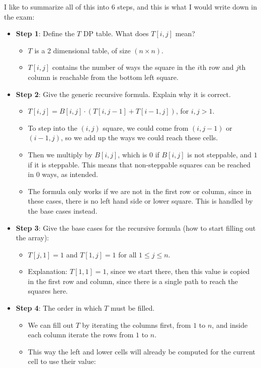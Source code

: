 I like to summarize all of this into 6 steps, and this is what I would write down in the exam:

\begin{itemize}
    \item \textbf{Step 1}: Define the $T$ DP table. What does $T[i,j]$ mean?
    \begin{itemize}
        \item $T$ is a 2 dimensional table, of size $(n \times n)$.
        \item $T[i, j]$ contains the number of ways the square in the $i$th row and $j$th column is reachable from the bottom left square.
    \end{itemize}
    \item \textbf{Step 2}: Give the generic recursive formula. Explain why it is correct.
    \begin{itemize}
        \item $T[i,j] = B[i,j]\cdot{}(T[i, j-1] + T[i-1, j])$, for $i,j>1$.
        \item To step into the $(i,j)$ square, we could come from $(i,j-1)$ or $(i-1,j)$, so we add up the ways we could reach these cells.
        \item Then we multiply by $B[i,j]$, which is $0$ if $B[i,j]$ is not steppable, and $1$ if it is steppable. This means that non-steppable squares can be reached in $0$ ways, as intended.
        \item The formula only works if we are not in the first row or column, since in these cases, there is no left hand side or lower square. This is handled by the base cases instead.
    \end{itemize}
    \item \textbf{Step 3}: Give the base cases for the recursive formula (how to start filling out the array):
    \begin{itemize}
        \item $T[j,1] = 1$ and $T[1,j] = 1$ for all $1\leq{}j\leq{}n$.
        \item Explanation: $T[1,1] = 1$, since we start there, then this value is copied in the first row and column, since there is a single path to reach the squares here.
    \end{itemize}
    \item \textbf{Step 4}: The order in which $T$ must be filled.
    \begin{itemize}
        \item We can fill out $T$ by iterating the columns first, from $1$ to $n$, and inside each column iterate the rows from $1$ to $n$.
        \item This way the left and lower cells will already be computed for the current cell to use their value:
    \end{itemize}
\end{itemize}

